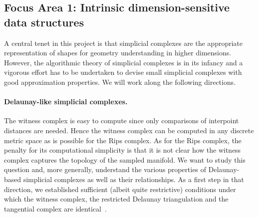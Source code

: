\subsection*{Focus Area 1:  Intrinsic dimension-sensitive data structures} 

A central tenet in this project is that simplicial complexes are the appropriate representation of shapes  for geometry understanding in higher dimensions. However,
the algorithmic theory of simplicial complexes is in its infancy and a vigorous effort has to be undertaken to devise small simplicial complexes with good approximation properties.
We will work along the following directions.



\paragraph{Delaunay-like  simplicial complexes.} 
The witness complex is easy to compute since only comparisons of interpoint distances are needed. Hence the witness complex can be computed in any discrete metric space as is possible for the Rips complex. 
As for the Rips complex, the penalty for its computational simplicity is that it is not clear how the witness complex captures the topology of the sampled manifold. 
We want to study this question and, more generally, understand the various properties of Delaunay-based simplicial complexes as well as their relationships. As a  first step in that direction, we established sufficient (albeit quite restrictive) conditions under which the witness complex, the restricted Delaunay triangulation and the tangential complex are identical~\cite{boissonnat2012stab}. 

